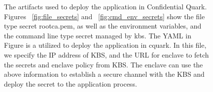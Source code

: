 \begin{figure}[H]
\begin{minipage}{0.9\textwidth}
\begin{subcolumns}[0.62\textwidth]
    \nextsubfigure
    \end{subcolumns}
    \end{minipage}
    
    \caption[The artifacts used to deploy the application in Confidential Quark]{The artifacts used to deploy the application in Confidential Quark. Figures ~\ref{fig:file_secrets} and ~\ref{fig:cmd_env_secrets} show the file type secret root\-ca.pem, as well as the environment variables, and the command line type secret managed by kbs. The YAML in Figure  is
    a utilized to deploy the application in cquark. In this file, we specify the IP address of KBS, and the URL for enclave to fetch the secrets and enclave policy from KBS. The enclave can use the above information to establish a secure channel with the KBS and 
    deploy the secret to the application process.}
    \label{fig:cquark_deployment}
\end{figure}


